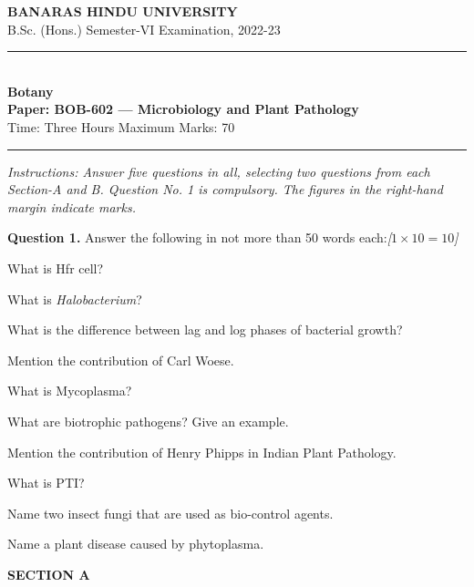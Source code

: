 \documentclass[11pt,a4paper]{article}
\newcommand{\pts}[1]{\hfill   \textit{[#1]}}
\begin{document}
\begin{center}
  {\large\bfseries BANARAS HINDU UNIVERSITY}\\[2pt]
  {\normalsize B.Sc. (Hons.) Semester-VI Examination, 2022-23}\\[6pt]
  \rule{0.8\linewidth}{0.5pt}\\[6pt]
  {\large\bfseries Botany}\\[4pt]
  {\large\bfseries Paper: BOB-602 --- Microbiology and Plant Pathology}\\[4pt]
  {\normalsize Time: Three Hours \hfill Maximum Marks: 70}
\end{center}

\rule{\linewidth}{0.4pt}

\smallskip



\noindent   \textit{Instructions: Answer five questions in all, selecting two questions from each Section-A and B. Question No. 1 is compulsory. The figures in the right-hand margin indicate marks.}

\bigskip

\medskip


\noindent   \textbf{Question 1.} Answer the following in not more than 50 words each:\pts{$1  \times 10 = 10$}

\begin{parts}
  \item What is Hfr cell?
  \item What is   \textit{Halobacterium}?
  \item What is the difference between lag and log phases of bacterial growth?
  \item Mention the contribution of Carl Woese.
  \item What is Mycoplasma?
  \item What are biotrophic pathogens? Give an example.
  \item Mention the contribution of Henry Phipps in Indian Plant Pathology.
  \item What is PTI?
  \item Name two insect fungi that are used as bio-control agents.
  \item Name a plant disease caused by phytoplasma.
\end{parts}

\bigskip

\begin{center}
   \textbf{SECTION A}
\end{center}
\medskip
\end{document}
